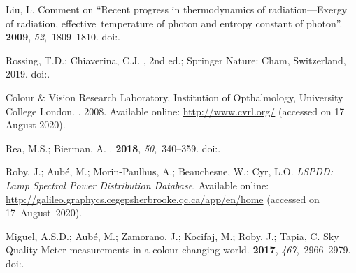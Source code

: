 \documentclass[energies,article,accept,moreauthors,pdftex]{Definitions/mdpi}\usepackage[]{graphicx}\usepackage[]{color}
\begin{document}
\begin{thebibliography}{999}
Liu, L.
\newblock Comment on ``Recent progress in thermodynamics of radiation---Exergy
  of radiation, \mbox{effective temperature} of photon and entropy constant of
  photon''.
 {\bf 2009},
  {\em 52},~1809--1810.%
\newblock
  doi:{\href{https://doi.org/10.1007/s11431-009-0086-4}{}}.

Rossing, T.D.; Chiaverina, C.J.
, 2nd
  ed.; Springer Nature: Cham, Switzerland,  2019. %
\newblock
  doi:{\href{https://doi.org/10.1007/978-3-030-27103-9}{}}.

{Colour \& Vision Research Laboratory, Institution of Opthalmology, University
  College London}.
. 2008. Available online: 
\newblock \url{http://www.cvrl.org/}
\newblock (accessed on 17 August 2020).%

Rea, M.S.; Bierman, A.
.
 {\bf 2018}, {\em
  50},~340--359.
\newblock
  doi:{\href{https://doi.org/10.1177/1477153516668230}{}}.%


Roby, J.; Aub\'{e}, M.; Morin-Paulhus, A.; Beauchesne, W.; Cyr, L.O.
\newblock \emph{{LSPDD}: Lamp Spectral Power Distribution Database}.  Available online: 
\newblock \url{http://galileo.graphycs.cegepsherbrooke.qc.ca/app/en/home}
\newblock (accessed on \mbox{17 August 2020}).%

Miguel, A.S.D.; Aub{\'e}, M.; Zamorano, J.; Kocifaj, M.; Roby, J.; Tapia, C.
\newblock Sky Quality Meter measurements in a colour-changing world.
 {\bf 2017},
  {\em 467},~2966--2979.
\newblock
  doi:{\href{https://doi.org/10.1093/mnras/stx145}{}}.%


\end{thebibliography}
\end{document}
